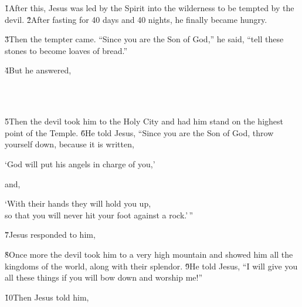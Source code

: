 \v{1}After this, Jesus was led by the Spirit into the wilderness to be tempted by the devil. \v{2}After fasting for 40 days and 40 nights, he finally became hungry.

\v{3}Then the tempter came. ``Since you are the Son of God,'' he said, ``tell these stones to become loaves of bread.''

\v{4}But he answered, 

\begin{poetry}
\poeml {} \\
\poemll    {} \\
\poemlll       {}
\end{poetry}

\v{5}Then the devil took him to the Holy City and had him stand on the highest point of the Temple. \v{6}He told Jesus, ``Since you are the Son of God, throw yourself down, because it is written,

\begin{poetry}
\poeml `God will put his angels in charge of you,'
\end{poetry}

and,

\begin{poetry}
\poeml `With their hands they will hold you up, \\
\poemll    so that you will never hit your foot against a rock.'\,''
\end{poetry}

\v{7}Jesus responded to him, 

\v{8}Once more the devil took him to a very high mountain and showed him all the kingdoms of the world, along with their splendor. \v{9}He told Jesus, ``I will give you all these things if you will bow down and worship me!''

\v{10}Then Jesus told him, 

